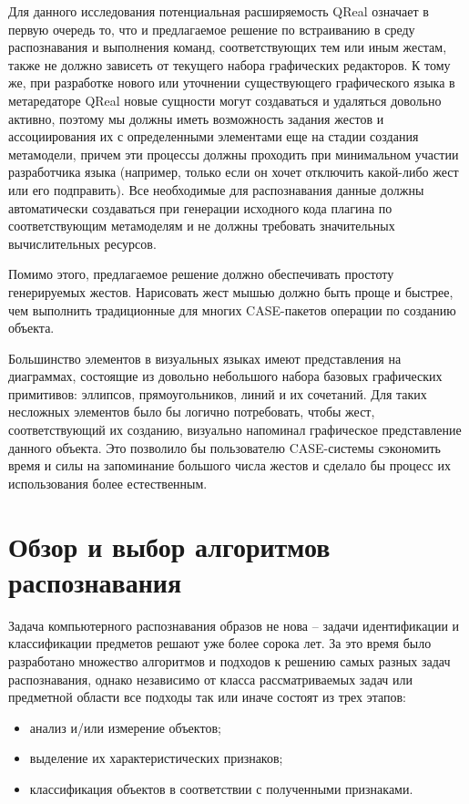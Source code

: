 \documentclass[a5paper]{article}
\begin{document}
Для данного исследования потенциальная расширяемость QReal означает в первую очередь то, что и предлагаемое решение по встраиванию в среду 
распознавания и выполнения команд, соответствующих тем или иным жестам, также не должно зависеть от текущего набора графических редакторов. 
К тому же, при разработке нового или уточнении существующего графического языка в метаредаторе QReal новые сущности могут создаваться и 
удаляться довольно активно, поэтому мы должны иметь возможность задания жестов и ассоциирования их с определенными элементами еще на стадии
создания метамодели, причем эти процессы должны проходить при минимальном участии разработчика языка (например, только если он хочет 
отключить какой-либо жест или его подправить). Все необходимые для распознавания данные должны автоматически создаваться при генерации 
исходного кода плагина по соответствующим метамоделям и не должны требовать значительных вычислительных ресурсов.

Помимо этого, предлагаемое решение должно обеспечивать простоту генерируемых жестов. Нарисовать жест мышью должно быть проще и быстрее, 
чем выполнить традиционные для многих CASE-пакетов операции по созданию объекта. 

Большинство элементов в визуальных языках имеют представления на диаграммах, состоящие из довольно небольшого набора базовых графических 
примитивов: эллипсов, прямоугольников, линий и их сочетаний. Для таких несложных элементов было бы логично потребовать, чтобы жест, 
соответствующий их созданию, визуально напоминал графическое представление данного объекта. Это позволило бы пользователю CASE-системы 
сэкономить время и силы на запоминание большого числа жестов и сделало бы процесс их использования более естественным. 

\section{Обзор и выбор алгоритмов распознавания}
Задача компьютерного распознавания образов не нова -- задачи идентификации и классификации предметов решают уже более сорока лет. За это 
время было разработано множество алгоритмов и подходов к решению самых разных задач распознавания, однако независимо от класса 
рассматриваемых задач или предметной области все подходы так или иначе состоят из трех этапов: 
\begin{itemize}
  \item анализ и/или измерение объектов;
  \item выделение их характеристических признаков;
  \item классификация объектов в соответствии с полученными признаками.
\end{itemize}
\end{document}
